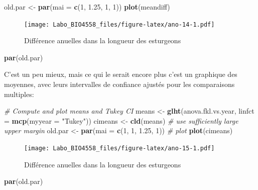\documentclass[12pt,]{book}
\newenvironment{Shaded}{\begin{snugshade}}{\end{snugshade}}
\newcommand{\CommentTok}[1]{\textcolor[rgb]{0.37,0.37,0.37}{\textit{#1}}}
\newcommand{\DataTypeTok}[1]{\textcolor[rgb]{0.27,0.27,0.27}{#1}}
\newcommand{\DecValTok}[1]{\textcolor[rgb]{0.06,0.06,0.06}{#1}}
\newcommand{\FloatTok}[1]{\textcolor[rgb]{0.06,0.06,0.06}{#1}}
\newcommand{\KeywordTok}[1]{\textcolor[rgb]{0.27,0.27,0.27}{\textbf{#1}}}
\newcommand{\NormalTok}[1]{#1}
\newcommand{\StringTok}[1]{\textcolor[rgb]{0.5,0.5,0.5}{#1}}
\begin{document}
\begin{Shaded}
\begin{Highlighting}[]
\NormalTok{old.par <-}\StringTok{ }\KeywordTok{par}\NormalTok{(}\DataTypeTok{mai =} \KeywordTok{c}\NormalTok{(}\DecValTok{1}\NormalTok{, }\FloatTok{1.25}\NormalTok{, }\DecValTok{1}\NormalTok{, }\DecValTok{1}\NormalTok{))}
\KeywordTok{plot}\NormalTok{(meandiff)}
\end{Highlighting}
\end{Shaded}

\begin{figure}
\centering
\texttt{[image: Labo\_BIO4558\_files/figure-latex/ano-14-1.pdf]}
\caption{\label{fig:ano-14}Différence anuelles dans la longueur des esturgeons}
\end{figure}

\begin{Shaded}
\begin{Highlighting}[]
\KeywordTok{par}\NormalTok{(old.par)}
\end{Highlighting}
\end{Shaded}

C'est un peu mieux, mais ce qui le serait encore plus c'est un graphique des moyennes, avec leurs intervalles de confiance ajustés pour les comparaisons multiples:

\begin{Shaded}
\begin{Highlighting}[]
\CommentTok{# Compute and plot means and Tukey CI}
\NormalTok{means <-}\StringTok{ }\KeywordTok{glht}\NormalTok{(anova.fkl.vs.year, }\DataTypeTok{linfct =} \KeywordTok{mcp}\NormalTok{(}\DataTypeTok{myyear =}
\StringTok{"Tukey"}\NormalTok{))}
\NormalTok{cimeans <-}\StringTok{ }\KeywordTok{cld}\NormalTok{(means)}
\CommentTok{# use sufficiently large upper margin}
\NormalTok{old.par <-}\StringTok{ }\KeywordTok{par}\NormalTok{(}\DataTypeTok{mai =} \KeywordTok{c}\NormalTok{(}\DecValTok{1}\NormalTok{, }\DecValTok{1}\NormalTok{, }\FloatTok{1.25}\NormalTok{, }\DecValTok{1}\NormalTok{))}
\CommentTok{# plot}
\KeywordTok{plot}\NormalTok{(cimeans)}
\end{Highlighting}
\end{Shaded}

\begin{figure}
\centering
\texttt{[image: Labo\_BIO4558\_files/figure-latex/ano-15-1.pdf]}
\caption{\label{fig:ano-15}Différence anuelles dans la longueur des esturgeons}
\end{figure}

\begin{Shaded}
\begin{Highlighting}[]
\KeywordTok{par}\NormalTok{(old.par)}
\end{Highlighting}
\end{Shaded}
\end{document}
